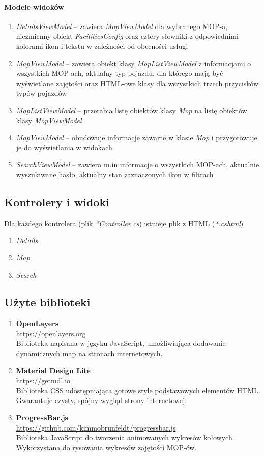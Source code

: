 \paragraph{Modele widoków}
\begin{enumerate}
\item \textit{DetailsViewModel} -- zawiera \textit{MopViewModel} dla wybranego MOP-a, niezmienny obiekt \textit{FacilitiesConfig} oraz cztery słowniki z odpowiednimi kolorami ikon i tekstu w zależności od obecności usługi
\item \textit{MapViewModel} -- zawiera obiekt klasy \textit{MopListViewModel} z informacjami o wszystkich MOP-ach, aktualny typ pojazdu, dla którego mają być wyświetlane zajętości oraz HTML-owe klasy dla wszystkich trzech przycisków typów pojazdów
\item \textit{MopListViewModel} -- przerabia listę obiektów klasy \textit{Mop} na listę obiektów klasy \textit{MopViewModel}
\item \textit{MopViewModel} -- obudowuje informacje zawarte w klasie \textit{Mop} i przygotowuje je do wyświetlania w widokach
\item \textit{SearchViewModel} -- zawiera m.in informacje o wszystkich MOP-ach, aktualnie wyszukiwane hasło, aktualny stan zaznaczonych ikon w filtrach
\end{enumerate}

\subsection{Kontrolery i widoki}
Dla każdego kontrolera (plik \textit{*Controller.cs}) istnieje plik z HTML (\textit{*.cshtml})
\begin{enumerate}
\item \textit{Details}
\item \textit{Map}
\item \textit{Search}
\end{enumerate}

\subsection{Użyte biblioteki}
\begin{enumerate}
\item \textbf{OpenLayers} \\
\url{https://openlayers.org}\\
Biblioteka napisana w języku JavaScript, umożliwiająca dodawanie dynamicznych map na stronach internetowych.

\item \textbf{Material Design Lite} \\
\url{https://getmdl.io}\\
Biblioteka CSS udostępniająca gotowe style podstawowych elementów HTML. Gwarantuje czysty, spójny wygląd strony internetowej.

\item \textbf{ProgressBar.js} \\
\url{https://github.com/kimmobrunfeldt/progressbar.js}\\
Biblioteka JavaScript do tworzenia animowanych wykresów kołowych. Wykorzystana do rysowania wykresów zajętości MOP-ów.
\end{enumerate}


